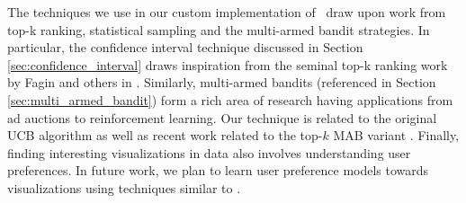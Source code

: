 


The techniques we use in our custom implementation of \SeeDB\ draw upon work
from top-k ranking, statistical sampling and the multi-armed bandit strategies. 
In particular, the confidence interval technique discussed in Section
\ref{sec:confidence_interval} draws inspiration from the seminal top-k ranking
work by Fagin and others in \cite{DBLP:conf/pods/FaginLN01, DBLP:conf/vldb/IlyasAE04}.
Similarly, multi-armed bandits (referenced in Section
\ref{sec:multi_armed_bandit}) form 
a rich area of research having applications from ad auctions to reinforcement learning. 
Our technique is related to the original UCB algorithm \cite{AuerCF02, LaiR85}
as well as recent work related to the top-$k$ MAB variant \cite{BubeckWV13,
audibert2010best}.
Finally, finding interesting visualizations in data also involves understanding
user preferences. 
In future work, we plan to learn user preference models towards visualizations
using techniques similar to \cite{CHI:YangLZ14, IUIGotzW09}. 

